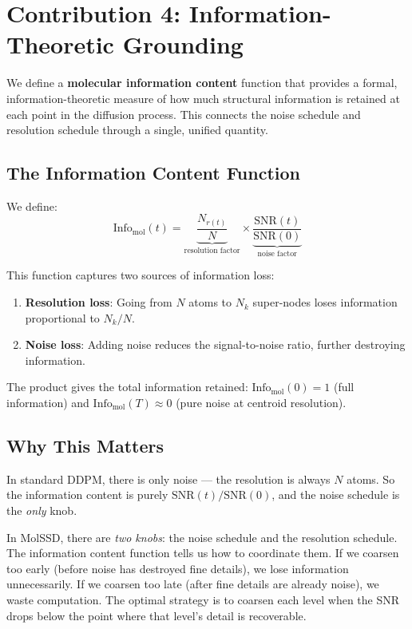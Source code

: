 \documentclass[12pt,a4paper]{article}
\begin{document}
\section{Contribution 4: Information-Theoretic Grounding}

\begin{noveltybox}
We define a \textbf{molecular information content} function that provides a formal, information-theoretic measure of how much structural information is retained at each point in the diffusion process. This connects the noise schedule and resolution schedule through a single, unified quantity.
\end{noveltybox}

\subsection{The Information Content Function}

We define:
\begin{equation}
\text{Info}_{\text{mol}}(t) = \underbrace{\frac{N_{r(t)}}{N}}_{\text{resolution factor}} \times \underbrace{\frac{\text{SNR}(t)}{\text{SNR}(0)}}_{\text{noise factor}}
\end{equation}

This function captures two sources of information loss:
\begin{enumerate}
  \item \textbf{Resolution loss}: Going from $N$ atoms to $N_k$ super-nodes loses information proportional to $N_k / N$.
  \item \textbf{Noise loss}: Adding noise reduces the signal-to-noise ratio, further destroying information.
\end{enumerate}

The product gives the total information retained: $\text{Info}_{\text{mol}}(0) = 1$ (full information) and $\text{Info}_{\text{mol}}(T) \approx 0$ (pure noise at centroid resolution).

\subsection{Why This Matters}

\begin{insightbox}
In standard DDPM, there is only noise --- the resolution is always $N$ atoms. So the information content is purely $\text{SNR}(t)/\text{SNR}(0)$, and the noise schedule is the \emph{only} knob.

In MolSSD, there are \emph{two knobs}: the noise schedule and the resolution schedule. The information content function tells us how to coordinate them. If we coarsen too early (before noise has destroyed fine details), we lose information unnecessarily. If we coarsen too late (after fine details are already noise), we waste computation. The optimal strategy is to coarsen each level when the SNR drops below the point where that level's detail is recoverable.
\end{insightbox}
\end{document}
